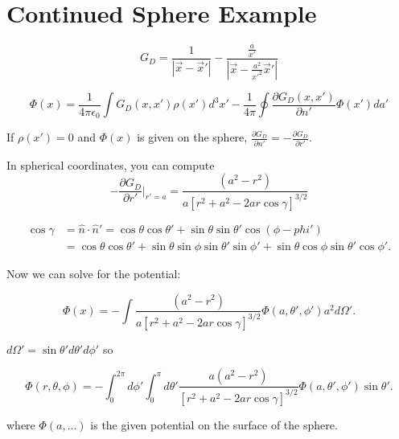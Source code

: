 \documentclass[a4paper,twoside,master.tex]{subfiles}
\begin{document}

\section{Continued Sphere Example}%
\label{sec:continued_sphere_example}

\begin{equation}
    G_D = \frac{1}{|\vec{x}-\vec{x}'|} - \frac{\frac{a}{x'}}{\left|\vec{x}-\frac{a^2}{x'^2}\vec{x}'\right|}
\end{equation}

\begin{equation}
    \Phi(x) = \frac{1}{4\pi\epsilon_0}\int G_D(x,x')\rho(x')d^3x'-\frac{1}{4\pi}\oint\frac{\partial G_D(x,x')}{\partial n'}\Phi(x')da'
\end{equation}

If $\rho(x') = 0$ and $\Phi(x)$ is given on the sphere,
$\frac{\partial G_D}{\partial n'} = -\frac{\partial G_D}{\partial r'}.$

In spherical coordinates, you can compute
\begin{equation}
    -\frac{\partial G_D}{\partial r'}\bigg|_{r'=a}=\frac{(a^2-r^2)}{a[r^2+a^2-2ar\cos\gamma]^{3/2}}
\end{equation}

\begin{align}
    \cos\gamma &= \hat{n}\cdot\hat{n}' = \cos\theta\cos\theta'+\sin\theta\sin\theta'\cos(\phi-phi')\\
    &= \cos\theta\cos\theta' + \sin\theta\sin\phi\sin\theta'\sin\phi' + \sin\theta\cos\phi\sin\theta'\cos\phi'
.\end{align}


Now we can solve for the potential:

\begin{equation}
    \Phi(x) = -\int\frac{(a^2-r^2)}{a[r^2+a^2-2ar\cos\gamma]^{3/2}}\Phi(a,\theta',\phi')a^2d\Omega'.
\end{equation}

$d\Omega' = \sin\theta'd\theta'd\phi'$ so

\begin{equation}
    \Phi(r,\theta,\phi) = -\int^{2\pi}_{0}d\phi'\int^{\pi}_{0}d\theta'\frac{a(a^2-r^2)}{[r^2+a^2-2ar\cos\gamma]^{3/2}}\Phi(a,\theta',\phi')\sin\theta'.
\end{equation}

where $\Phi(a,...)$ is the given potential on the surface of the
sphere.
\end{document}
